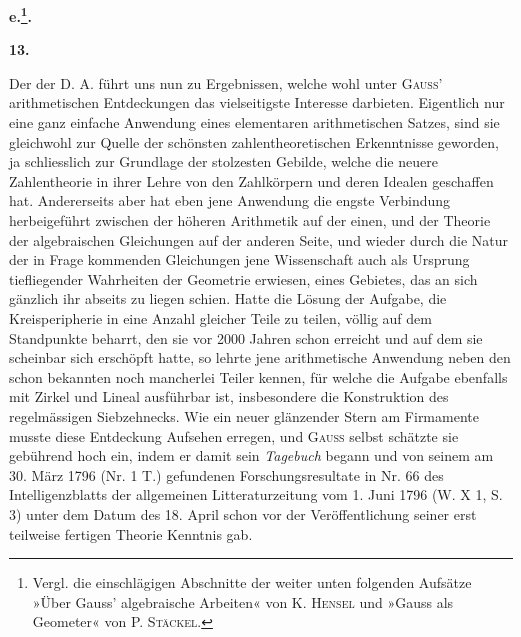 \begin{center}\bfseries e.\quad{}\footnote{Vergl. die einschlägigen Abschnitte der weiter unten folgenden Aufsätze »Über Gauss’ algebraische Arbeiten« von K. \textsc{Hensel} und »Gauss als Geometer« von P. \textsc{Stäckel}.}.\end{center}
\begin{center}\bfseries 13.\end{center}
\noindent\hspace*{\parindent}Der  der D. A. führt uns nun zu Ergebnissen, welche wohl unter \textsc{Gauss}’ arithmetischen Entdeckungen das vielseitigste Interesse darbieten. Eigentlich nur eine ganz einfache Anwendung eines elementaren arithmetischen Satzes, sind sie gleichwohl zur Quelle der schönsten zahlentheoretischen Erkenntnisse geworden, ja schliesslich zur Grundlage der stolzesten Gebilde, welche die neuere Zahlentheorie in ihrer Lehre von den Zahlkörpern und deren Idealen geschaffen hat. Andererseits aber hat eben jene Anwendung die engste Verbindung herbeigeführt zwischen der höheren Arithmetik auf der einen, und der Theorie der algebraischen Gleichungen auf der anderen Seite, und wieder durch die Natur der in Frage kommenden Gleichungen jene Wissenschaft auch als Ursprung tiefliegender Wahrheiten der Geometrie erwiesen, eines Gebietes, das an sich gänzlich ihr
\newpage{}
\noindent abseits zu liegen schien. Hatte die Lösung der Aufgabe, die Kreisperipherie in eine Anzahl gleicher Teile zu teilen, völlig auf dem Standpunkte beharrt, den sie vor 2000 Jahren schon erreicht und auf dem sie scheinbar sich erschöpft hatte, so lehrte jene arithmetische Anwendung neben den schon bekannten noch mancherlei Teiler kennen, für welche die Aufgabe ebenfalls mit Zirkel und Lineal ausführbar ist, insbesondere die Konstruktion des regelmässigen Siebzehnecks. Wie ein neuer glänzender Stern am Firmamente musste diese Entdeckung Aufsehen erregen, und \textsc{Gauss} selbst schätzte sie gebührend hoch ein, indem er damit sein \textit{Tagebuch} begann und von seinem am 30. März 1796 (Nr. 1 T.) gefundenen Forschungsresultate in Nr. 66 des Intelligenzblatts der allgemeinen Litteraturzeitung vom 1. Juni 1796 (W. X 1, S. 3) unter dem Datum des 18. April schon vor der Veröffentlichung seiner erst teilweise fertigen Theorie Kenntnis gab.

